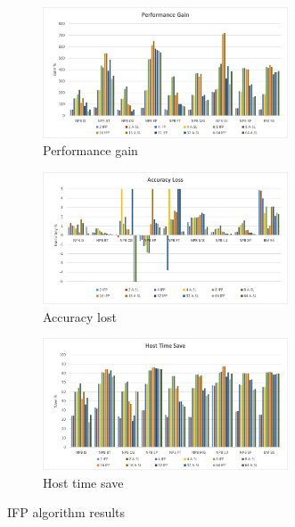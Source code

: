 \begin{figure}[H]
\centering
\begin{subfigure}{\textwidth}
    \centering
    \includegraphics[width=0.8\textwidth]{Images/Performance_ADA_INC_PC.png}
    \caption{ Performance gain}
    \label{fig:Performance_ADAINCPC}
\end{subfigure}
\begin{subfigure}{\textwidth}
    \centering
    \includegraphics[width=0.8\textwidth]{Images/Accuracy_ADA_INC_PC.png}
    \caption{ Accuracy lost}
    \label{fig:Accuracy_ADAINCPC}
\end{subfigure}
\begin{subfigure}{\textwidth}
    \centering
    \includegraphics[width=0.8\textwidth]{Images/Host_ADA_INC_PC.png}
    \caption{ Host time save}
    \label{fig:Host_ADAINCPC}
\end{subfigure}
        
\caption{IFP algorithm results}
\label{fig:results_ADAINCPC}
\end{figure}


